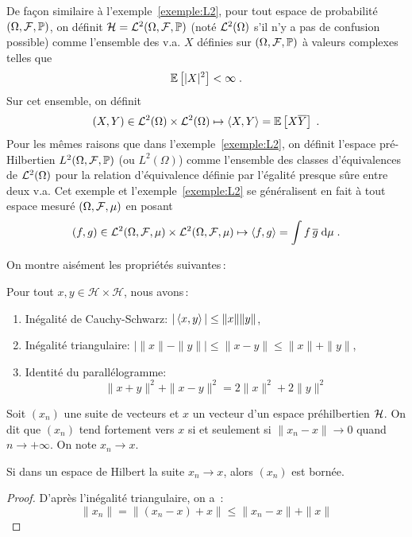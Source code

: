 \begin{example}
\label{exemple:L2Omega}
De fa\c{c}on similaire \`{a} l'exemple~\ref{exemple:L2}, pour tout espace de
probabilit\'{e} $(\Omega,\mathcal{F},\mathbb{P})$, on d\'{e}finit $\mathcal{H}=\mathcal{L}^2(\Omega,\mathcal{F},\mathbb{P})$
(not\'{e} $\mathcal{L}^2(\Omega)$ s'il n'y a pas de confusion possible) comme l'ensemble
des v.a. $X$ d\'{e}finies sur  $(\Omega,\mathcal{F},\mathbb{P})$ \`{a} valeurs complexes telles que
$$
{\mathbb E}\left[ |X|^2 \right]<\infty\;.
$$
Sur cet ensemble, on d\'{e}finit
$$
   (X,Y) \in \mathcal{L}^2(\Omega)\times \mathcal{L}^2(\Omega)
    \mapsto \left\langle X, Y \right\rangle={\mathbb E}\left[  X \overline{Y} \right]\;.
$$
Pour les m\^{e}mes raisons que dans l'exemple~\ref{exemple:L2}, on d\'{e}finit l'espace
pr\'{e}-Hilbertien $L^2(\Omega,\mathcal{F},\mathbb{P})$ (ou $L^2(\Omega)$) comme l'ensemble des
classes d'\'{e}quivalences de $\mathcal{L}^2(\Omega)$ pour la relation d'\'{e}quivalence
d\'{e}finie par l'\'{e}galit\'{e} presque s\^{u}re entre deux v.a.
Cet exemple et l'exemple~\ref{exemple:L2} se g\'{e}n\'{e}ralisent en fait \`{a} tout espace
mesur\'{e} $(\Omega,\mathcal{F},\mu)$ en posant
$$
(f,g) \in \mathcal{L}^2(\Omega,\mathcal{F},\mu)\times \mathcal{L}^2(\Omega,\mathcal{F},\mu)
    \mapsto \left\langle f, g \right\rangle=\int f\, \overline{g} \;\mathrm{d}\mu \;.
$$
\end{example}

On montre ais\'{e}ment les propri\'{e}t\'{e}s suivantes\,:
\begin{theorem}

\label{theo:cauchyandco}
 Pour tout $x,y \in \mathcal{H}\times
\mathcal{H}$, nous avons\,:
\begin{enumerate}[label=\emph{\alph*})]
   \item In\'{e}galit\'{e} de Cauchy-Schwarz:
     $|\left\langle x, y \right\rangle| \leq \|x\| \|y\|$,
   \item In\'{e}galit\'{e} triangulaire:
 $\left | \|x\|-\|y\| \right |\leq \| x - y \| \leq \| x \| + \| y\|$,
   \item Identit\'{e} du parall\'{e}logramme:
\[
\| x + y \|^2 + \| x-y\|^2 = 2 \|x\|^2 + 2 \|y\|^2
\]
\end{enumerate}
\end{theorem}
\begin{definition}
Soit $(x_n)$ une suite de vecteurs  et $x$ un vecteur d'un espace
pr\'{e}hilbertien $\mathcal{H}$. On dit que $(x_n)$ tend fortement
vers $x$ si et seulement si $\|x_n-x\| \rightarrow 0$ quand
$n\rightarrow +\infty$. On note $x_n \rightarrow x$.
\end{definition}
\begin{proposition}
\label{prop:cvgceforte-implique-borne}
Si dans un espace de Hilbert la suite $x_n\rightarrow x$, alors
$(x_n)$ est born\'{e}e.
\end{proposition}
\begin{proof}\smartqed
D'apr\`{e}s l'in\'{e}galit\'{e} triangulaire, on a~:
$$
 \|x_n\|=\|(x_n-x)+x\|\leq \|x_n-x\|+\|x\|
$$

\end{proof}

